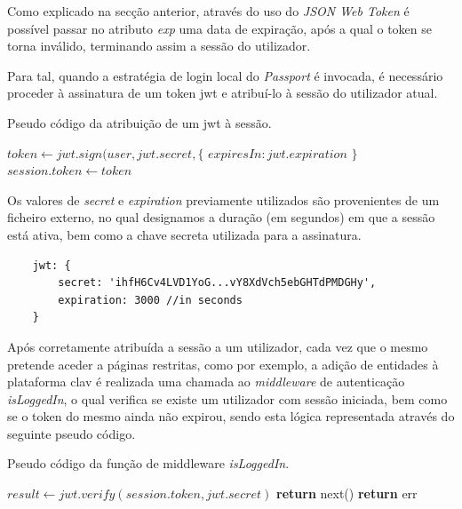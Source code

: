 Como explicado na secção anterior, através do uso do \emph{JSON Web Token} é possível passar no atributo \emph{exp} uma data de expiração, após a qual o token se torna inválido, terminando assim a sessão do utilizador.

Para tal, quando a estratégia de login local do \emph{Passport} é invocada, é necessário proceder à assinatura de um token \gls{jwt} e atribuí-lo à sessão do utilizador atual.

\begin{algorithm}
    \caption{Pseudo código da atribuição de um \gls{jwt} à sessão.}
    \begin{algorithmic}[1]
        \State $token \gets jwt.sign({user}, jwt.secret, \{$
        \State \indent $expiresIn : jwt.expiration$
        \State $\}$
        \State $session.token \gets token$
    \EndFunction
    \end{algorithmic}
\end{algorithm}

Os valores de \emph{secret} e \emph{expiration} previamente utilizados são provenientes de um ficheiro externo, no qual designamos a duração (em segundos) em que a sessão está ativa, bem como a chave secreta utilizada para a assinatura.

\begin{verbatim}
    jwt: {
        secret: 'ihfH6Cv4LVD1YoG...vY8XdVch5ebGHTdPMDGHy',
        expiration: 3000 //in seconds
    }
\end{verbatim}

Após corretamente atribuída a sessão a um utilizador, cada vez que o mesmo pretende aceder a páginas restritas, como por exemplo, a adição de entidades à plataforma \gls{clav} é realizada uma chamada ao \emph{middleware} de autenticação \emph{isLoggedIn}, o qual verifica se existe um utilizador com sessão iniciada, bem como se o token do mesmo ainda não expirou, sendo esta lógica representada através do seguinte pseudo código.

\begin{algorithm}
    \caption{Pseudo código da função  de middleware \emph{isLoggedIn}.}
    \begin{algorithmic}[1]
        \State $result \gets jwt.verify(session.token, jwt.secret)$
                \State \textbf{return} next()
            \Else
                \State \textbf{return} err
            \EndIf
        \EndIf
    \EndFunction
    \end{algorithmic}
\end{algorithm}

